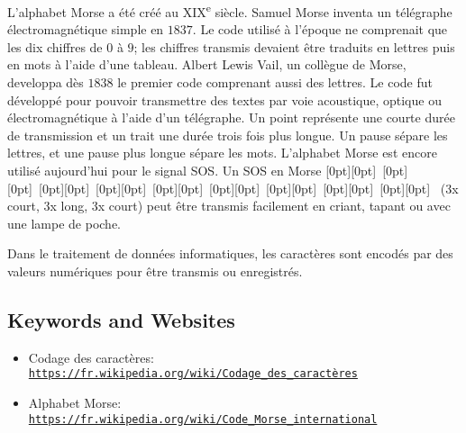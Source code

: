 \documentclass[a4paper,11pt]{report}
\newcommand{\BrochureUrlText}[1]{\texttt{#1}}
\newcommand{\taskGraphicsFolder}{..}
\begin{document}
L’alphabet Morse a été créé au XIX\textsuperscript{e} siècle. Samuel Morse inventa un télégraphe électromagnétique simple en $1837$. Le code utilisé à l’époque ne comprenait que les dix chiffres de $0$ à $9$; les chiffres transmis devaient être traduits en lettres puis en mots à l’aide d’une tableau. Albert Lewis Vail, un collègue de Morse, developpa dès $1838$ le premier code comprenant aussi des lettres. Le code fut développé pour pouvoir transmettre des textes par voie acoustique, optique ou électromagnétique à l’aide d’un télégraphe. Un point représente une courte durée de transmission et un trait une durée trois fois plus longue. Un pause sépare les lettres, et une pause plus longue sépare les mots. L’alphabet Morse est encore utilisé aujourd’hui pour le signal SOS. Un SOS en Morse \raisebox{\dimexpr -0.5ex +0.7ex \relax}[0pt][0pt]{}~\raisebox{\dimexpr -0.5ex +0.7ex \relax}[0pt][0pt]{}~\raisebox{\dimexpr -0.5ex +0.7ex \relax}[0pt][0pt]{}~\raisebox{\dimexpr -0.5ex +0.7ex \relax}[0pt][0pt]{}~\raisebox{\dimexpr -0.5ex +0.7ex \relax}[0pt][0pt]{}~\raisebox{\dimexpr -0.5ex +0.7ex \relax}[0pt][0pt]{}~\raisebox{\dimexpr -0.5ex +0.7ex \relax}[0pt][0pt]{}~\raisebox{\dimexpr -0.5ex +0.7ex \relax}[0pt][0pt]{}~\raisebox{\dimexpr -0.5ex +0.7ex \relax}[0pt][0pt]{}~ (3x court, 3x long, 3x court) peut être transmis facilement en criant, tapant ou avec une lampe de poche.

Dans le traitement de données informatiques, les caractères sont encodés par des valeurs numériques pour être transmis ou enregistrés.

{\raggedright

\subsection*{Keywords and Websites}

\begin{itemize}
  \item Codage des caractères: \href{https://fr.wikipedia.org/wiki/Codage_des_caract\%C3\%A8res}{\BrochureUrlText{https://fr.wikipedia.org/wiki/Codage\_des\_caractères}}
  \item Alphabet Morse: \href{https://fr.wikipedia.org/wiki/Code_Morse_international}{\BrochureUrlText{https://fr.wikipedia.org/wiki/Code\_Morse\_international}}
\end{itemize}


}
\end{document}
